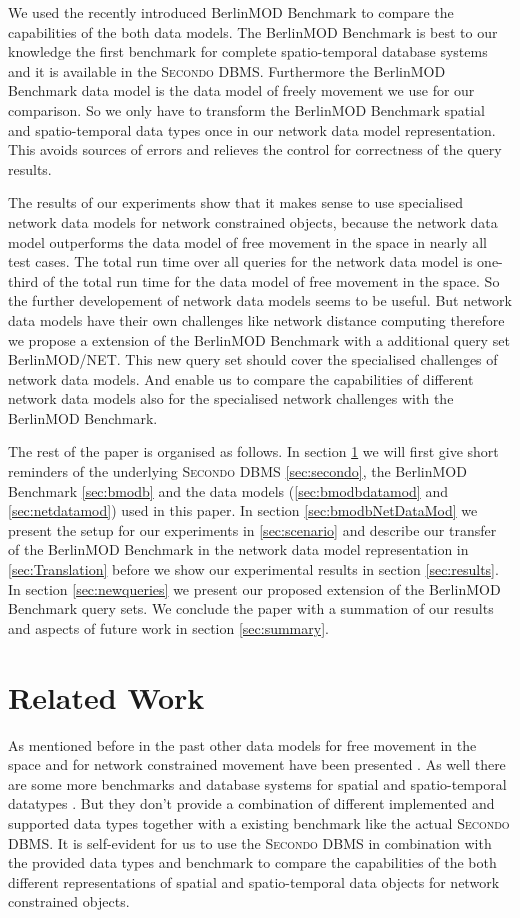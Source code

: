 \documentclass[a4paper]{article}
\newcommand{\secondo}{\textsc{Secondo}}
\newcommand{\bmodb} {BerlinMOD Benchmark}
\begin{document}
We used the recently introduced \bmodb{} \cite{BerlinMODVLDB} to compare the capabilities of the both data models. The \bmodb{} is best to our knowledge the first benchmark for complete spatio-temporal database systems and it is available in the \secondo{} DBMS. Furthermore the \bmodb{} data model is the data model of freely movement we use for our comparison. So we only have to transform the \bmodb{} spatial and spatio-temporal data types once in our network data model representation. This avoids sources of errors and relieves the control for correctness of the query results.

The results of our experiments show that it makes sense to use specialised network data models for network constrained objects, because the network data model outperforms the data model of free movement in the space in nearly all test cases. The total run time over all queries for the network data model is one-third of the total run time for the data model of free movement in the space. So the further developement of network data models seems to be useful. But network data models have their own challenges like network distance computing therefore we propose a extension of the \bmodb{} with a additional query set BerlinMOD/NET. This new query set should cover the specialised challenges of network data models. And enable us to compare the capabilities of different network data models also for the specialised network challenges with the \bmodb{}.

The rest of the paper is organised as follows. In section \ref{sec:relWork} we will first give short reminders of the underlying \secondo{} DBMS \ref{sec:secondo}, the \bmodb{} \ref{sec:bmodb} and the data models (\ref{sec:bmodbdatamod} and \ref{sec:netdatamod}) used in this paper. In section \ref{sec:bmodbNetDataMod} we present the setup for our experiments in \ref{sec:scenario} and describe our transfer of the \bmodb{} in the network data model representation in \ref{sec:Translation} before we show our experimental results in section \ref{sec:results}. In section \ref{sec:newqueries} we present our proposed extension of the \bmodb{} query sets. We conclude the paper with a summation of our results and aspects of future work in section \ref{sec:summary}.
\section{Related Work}
\label{sec:relWork}
As mentioned before in the past other data models for free movement in the space \cite{335426,chenzaniolosqlst} and for network constrained movement have been presented \cite{1146465,956692,VazWolfNetMod}. As well there are some more benchmarks \cite{COSTBenchmark, QueriesTheodoridis} and database systems for spatial and spatio-temporal datatypes \cite{HERMES,1054151}. But they don't provide a combination of different implemented and supported data types together with a existing benchmark like the actual \secondo{} DBMS. It is self-evident for us to use the \secondo{} DBMS in combination with the provided data types and benchmark to compare the capabilities of the both different representations of spatial and spatio-temporal data objects for network constrained objects.
\end{document}
